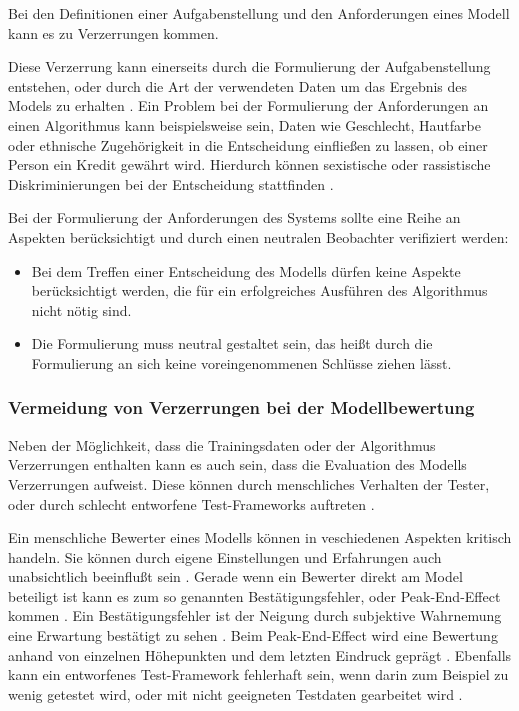 \documentclass[12pt]{article}
\begin{document}
Bei den Definitionen einer Aufgabenstellung und den Anforderungen eines Modell kann es zu Verzerrungen kommen.

Diese Verzerrung kann einerseits durch die Formulierung der Aufgabenstellung entstehen, oder durch die Art der verwendeten Daten um das Ergebnis des Models zu erhalten \cite{Srinivasan}.
Ein Problem bei der Formulierung der Anforderungen an einen Algorithmus kann beispielsweise sein, Daten wie Geschlecht, Hautfarbe oder ethnische Zugehörigkeit in die 
Entscheidung einfließen zu lassen, ob einer Person ein Kredit gewährt wird. Hierdurch können sexistische oder rassistische Diskriminierungen bei der Entscheidung stattfinden \cite{Srinivasan}.

Bei der Formulierung der Anforderungen des Systems sollte eine Reihe an Aspekten berücksichtigt und durch einen neutralen Beobachter verifiziert werden:
\begin{itemize}
    \item Bei dem Treffen einer Entscheidung des Modells dürfen keine Aspekte berücksichtigt werden, die für ein erfolgreiches Ausführen des Algorithmus nicht nötig sind.
    \item Die Formulierung muss neutral gestaltet sein, das heißt durch die Formulierung an sich keine voreingenommenen Schlüsse ziehen lässt.
\end{itemize}

\subsubsection{Vermeidung von Verzerrungen bei der Modellbewertung}
Neben der Möglichkeit, dass die Trainingsdaten oder der Algorithmus Verzerrungen enthalten kann es auch sein, dass die Evaluation des Modells Verzerrungen aufweist.
Diese können durch menschliches Verhalten der Tester, oder durch schlecht entworfene Test-Frameworks auftreten \cite{Srinivasan}.

Ein menschliche Bewerter eines Modells können in veschiedenen Aspekten kritisch handeln. Sie können durch eigene Einstellungen und Erfahrungen auch unabsichtlich beeinflußt sein \cite{Srinivasan}.
Gerade wenn ein Bewerter direkt am Model beteiligt ist kann es zum so genannten Bestätigungsfehler, oder \glqq Peak-End-Effect\grqq{} kommen \cite{Srinivasan}.
Ein Bestätigungsfehler ist der Neigung durch subjektive Wahrnemung eine Erwartung bestätigt zu sehen \cite{Srinivasan}. 
Beim \glqq Peak-End-Effect\grqq{} wird eine Bewertung anhand von einzelnen Höhepunkten und dem letzten Eindruck geprägt \cite{Srinivasan}.
Ebenfalls kann ein entworfenes Test-Framework fehlerhaft sein, wenn darin zum Beispiel zu wenig getestet wird, oder mit nicht geeigneten Testdaten gearbeitet wird \cite{Srinivasan}.
\end{document}
